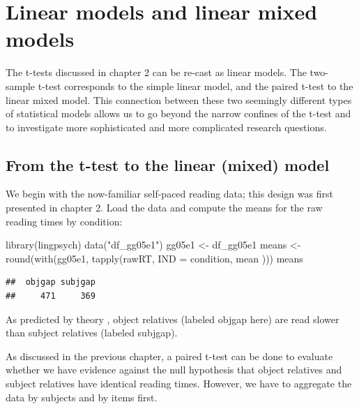\documentclass[
  12pt,
]{krantz}
\newenvironment{Shaded}{\begin{snugshade}}{\end{snugshade}}
\newcommand{\AttributeTok}[1]{\textcolor[rgb]{0.77,0.63,0.00}{#1}}
\newcommand{\FunctionTok}[1]{\textcolor[rgb]{0.00,0.00,0.00}{#1}}
\newcommand{\NormalTok}[1]{#1}
\newcommand{\OtherTok}[1]{\textcolor[rgb]{0.56,0.35,0.01}{#1}}
\newcommand{\StringTok}[1]{\textcolor[rgb]{0.31,0.60,0.02}{#1}}
\theoremstyle{definition}
\theoremstyle{definition}
\theoremstyle{definition}
\theoremstyle{definition}
\theoremstyle{remark}
\begin{document}
\hypertarget{linear-models-and-linear-mixed-models}{%
\chapter{Linear models and linear mixed models}\label{linear-models-and-linear-mixed-models}}

The t-tests discussed in chapter 2 can be re-cast as linear models. The two-sample t-test corresponds to the simple linear model, and the paired t-test to the linear mixed model. This connection between these two seemingly different types of statistical models allows us to go beyond the narrow confines of the t-test and to investigate more sophisticated and more complicated research questions.

\hypertarget{from-the-t-test-to-the-linear-mixed-model}{%
\section{From the t-test to the linear (mixed) model}\label{from-the-t-test-to-the-linear-mixed-model}}

We begin with the now-familiar \citet{grodner} self-paced reading data; this design was first presented in chapter 2. Load the data and compute the means for the raw reading times by condition:

\begin{Shaded}
\begin{Highlighting}[]
\FunctionTok{library}\NormalTok{(lingpsych)}
\FunctionTok{data}\NormalTok{(}\StringTok{"df\_gg05e1"}\NormalTok{)}
\NormalTok{gg05e1 }\OtherTok{\textless{}{-}}\NormalTok{ df\_gg05e1}
\NormalTok{means }\OtherTok{\textless{}{-}} \FunctionTok{round}\NormalTok{(}\FunctionTok{with}\NormalTok{(gg05e1, }\FunctionTok{tapply}\NormalTok{(rawRT,}
  \AttributeTok{IND =}\NormalTok{ condition,}
\NormalTok{  mean}
\NormalTok{)))}
\NormalTok{means}
\end{Highlighting}
\end{Shaded}

\begin{verbatim}
##  objgap subjgap 
##     471     369
\end{verbatim}

As predicted by theory \citep{grodner}, object relatives (labeled objgap here) are read slower than subject relatives (labeled subjgap).

As discussed in the previous chapter, a paired t-test can be done to evaluate whether we have evidence against the null hypothesis that object relatives and subject relatives have identical reading times. However, we have to aggregate the data by subjects and by items first.
\end{document}
